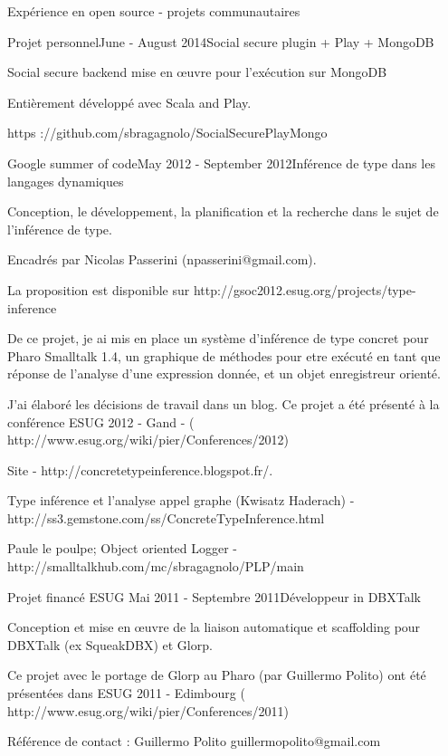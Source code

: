 \documentclass{resume} %
\begin{document}
\begin{rSection}{Exp\'{e}rience en open source - projets communautaires}
\begin{rSubsection}{Projet personnel}{June - August 2014}{Social secure plugin + Play + MongoDB}
	\item 
	\item Social secure backend mise en \oe uvre pour l'ex\'{e}cution sur MongoDB
	\item Enti\`{e}rement d\'{e}velopp\'{e} avec Scala and Play.
	\item https ://github.com/sbragagnolo/SocialSecurePlayMongo
\end{rSubsection}


\begin{rSubsection}{Google summer of code}{May 2012 - September 2012}{Inf\'{e}rence de type dans les langages dynamiques}
	\item 
	\item Conception, le d\'{e}veloppement, la planification et la recherche dans le sujet de l'inf\'{e}rence de type.
	\item Encadr\'{e}s par Nicolas Passerini (npasserini@gmail.com).
	\item La proposition est disponible sur  http://gsoc2012.esug.org/projects/type-inference
	\item De ce projet, je ai mis en place un syst\`{e}me d'inf\'{e}rence de type concret pour Pharo Smalltalk 1.4, un graphique de m\'{e}thodes pour etre ex\'{e}cut\'{e} en tant que r\'{e}ponse de l'analyse d'une expression donn\'{e}e, et un objet enregistreur orient\'{e}.
	\item J'ai \'{e}labor\'e les d\'{e}cisions de travail dans un blog. Ce projet a \'{e}t\'{e} pr\'{e}sent\'{e} \`a la conf\'{e}rence ESUG 2012 - Gand - ( http://www.esug.org/wiki/pier/Conferences/2012)
	\item Site -  http://concretetypeinference.blogspot.fr/. 
	\item Type inf\'{e}rence et l'analyse appel graphe (Kwisatz Haderach) -  http://ss3.gemstone.com/ss/ConcreteTypeInference.html
	\item Paule le poulpe; Object oriented Logger -  http://smalltalkhub.com/mc/sbragagnolo/PLP/main
\end{rSubsection}

 
\begin{rSubsection}{Projet financ\'{e} ESUG}{ Mai 2011 - Septembre 2011}{D\'{e}veloppeur in DBXTalk}
	\item 
	\item Conception et mise en œuvre de la liaison automatique et scaffolding pour DBXTalk (ex SqueakDBX) et Glorp.
	\item Ce projet avec le portage de Glorp au Pharo (par Guillermo Polito) ont \'{e}t\'{e} pr\'{e}sent\'{e}es dans ESUG 2011 - Edimbourg ( http://www.esug.org/wiki/pier/Conferences/2011)
	\item  R\'{e}f\'{e}rence de contact :  Guillermo Polito guillermopolito@gmail.com
\end{rSubsection}


\end{rSection}
\end{document}
